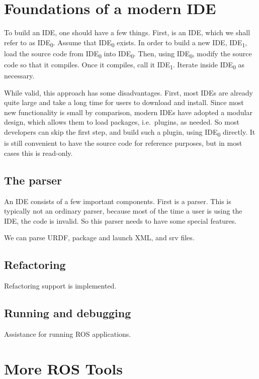 \documentclass[12pt,initial,twoside,maitrise]{dms}
\numberwithin{equation}{section}
\numberwithin{table}{chapter}
\numberwithin{figure}{chapter}
\begin{document}
\section{Foundations of a modern IDE}

To build an IDE, one should have a few things. First, is an IDE, which we shall refer to as IDE\textsubscript{0}. Assume that IDE\textsubscript{0} exists. In order to build a new IDE, IDE\textsubscript{1}, load the source code from IDE\textsubscript{0} into IDE\textsubscript{0}. Then, using IDE\textsubscript{0}, modify the source code so that it compiles. Once it compiles, call it IDE\textsubscript{1}. Iterate inside IDE\textsubscript{0} as necessary.

While valid, this approach has some disadvantages. First, most IDEs are already quite large and take a long time for users to download and install. Since most new functionality is small by comparison, modern IDEs have adopted a modular design, which allows them to load packages, i.e.\ plugins, as needed. So most developers can skip the first step, and build such a plugin, using IDE\textsubscript{0} directly. It is still convenient to have the source code for reference purposes, but in most cases this is read-only.

\subsection{The parser}

An IDE consists of a few important components. First is a parser. This is typically not an ordinary parser, because most of the time a user is using the IDE, the code is invalid. So this parser needs to have some special features.

We can parse URDF, package and launch XML, and srv files.

\subsection{Refactoring}

Refactoring support is implemented.

\subsection{Running and debugging}

Assistance for running ROS applications.

\section{More ROS Tools}
\end{document}
